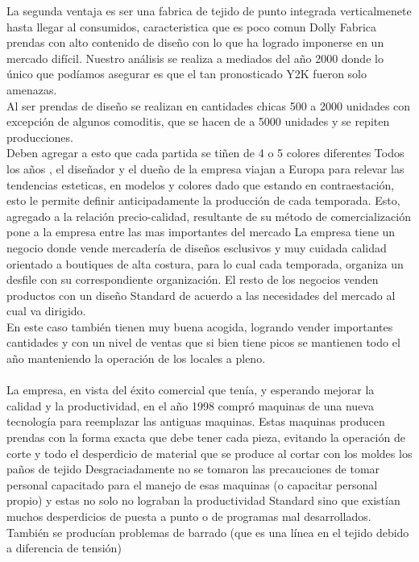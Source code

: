 \documentclass[a4paper,10pt,titlepage]{article}
\begin{document}
La segunda ventaja es ser una fabrica de tejido de punto integrada verticalmenete
hasta llegar al consumidos, caracteristica que es poco comun
Dolly Fabrica prendas con alto contenido de diseño con lo que ha logrado
imponerse en un mercado dif\'icil. Nuestro an\'alisis se realiza a mediados del año
2000 donde lo \'unico que pod\'iamos asegurar es que el tan pronosticado Y2K
fueron solo amenazas.\\
Al ser prendas de diseño se realizan en cantidades chicas 500 a 2000 unidades
con excepci\'on de algunos comoditis, que se hacen de a 5000 unidades y se
repiten producciones.\\
Deben agregar a esto que cada partida se tiñen de 4 o 5 colores diferentes
Todos los años , el diseñador y el dueño de la empresa viajan a Europa para
relevar las tendencias esteticas, en modelos y colores dado que estando en
contraestaci\'on, esto le permite definir anticipadamente la producci\'on de cada
temporada. Esto, agregado a la relaci\'on precio-calidad, resultante de su m\'etodo
de comercializaci\'on pone a la empresa entre las mas importantes del mercado
La empresa tiene un negocio donde vende mercader\'ia de diseños esclusivos y
muy cuidada calidad orientado a boutiques de alta costura, para lo cual cada
temporada, organiza un desfile con su correspondiente organizaci\'on. El resto de
los negocios venden productos con un diseño Standard de acuerdo a las
necesidades del mercado al cual va dirigido.\\
En este caso tambi\'en tienen muy buena acogida, logrando vender importantes
cantidades y con un nivel de ventas que si bien tiene picos se mantienen todo el
año manteniendo la operaci\'on de los locales a pleno.\\ \\
La empresa, en vista del \'exito comercial que ten\'ia, y esperando mejorar la calidad
y la productividad, en el año 1998 compr\'o maquinas de una nueva tecnolog\'ia para
reemplazar las antiguas maquinas. Estas maquinas producen prendas con la forma
exacta que debe tener cada pieza, evitando la operaci\'on de corte y todo el
desperdicio de material que se produce al cortar con los moldes los paños de tejido
Desgraciadamente no se tomaron las precauciones de tomar personal capacitado
para el manejo de esas maquinas (o capacitar personal propio) y estas no solo no
lograban la productividad Standard sino que exist\'ian muchos desperdicios de
puesta a punto o de programas mal desarrollados. Tambi\'en se produc\'ian
problemas de barrado (que es una l\'inea en el tejido debido a diferencia de tensi\'on)
\end{document}
